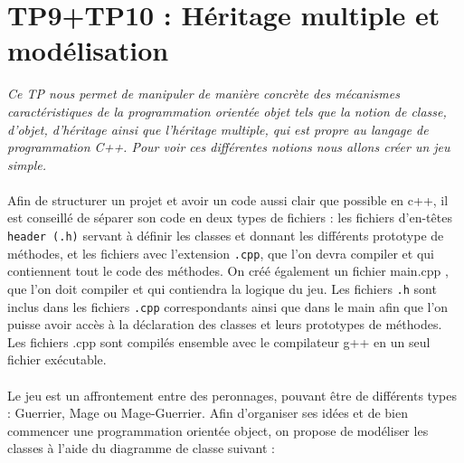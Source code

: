 \chapter{TP9+TP10 : Héritage multiple et modélisation}
\textit{Ce TP nous permet de manipuler de manière concrète des mécanismes caractéristiques de la programmation orientée objet tels que la notion de classe, d’objet, d’héritage ainsi que l’héritage multiple, qui est propre au langage de programmation C++.
Pour voir ces différentes notions nous allons créer un jeu simple.}
\\\\
Afin de structurer un projet et avoir un code aussi clair que possible en c++, il est conseillé de séparer son
code en deux types de fichiers : les fichiers d’en-têtes \texttt{header (.h)} servant à définir les classes et
donnant les différents prototype de méthodes, et les fichiers avec l’extension \texttt{.cpp}, que l’on devra compiler et qui contiennent tout le code des méthodes. On créé également un fichier main.cpp , que l’on doit compiler et qui contiendra la logique du jeu.
Les fichiers \texttt{.h} sont inclus dans les fichiers \texttt{.cpp} correspondants ainsi que dans le main afin que l’on puisse avoir accès à la déclaration des classes et leurs prototypes de méthodes.
Les fichiers .cpp sont compilés ensemble avec le compilateur g++ en un seul fichier exécutable.
\\\\
Le jeu est un affrontement entre des peronnages, pouvant être de différents types : Guerrier, Mage ou Mage-Guerrier.
Afin d'organiser ses idées et de bien commencer une programmation orientée object, on propose de modéliser les classes à l'aide du diagramme de classe suivant :

